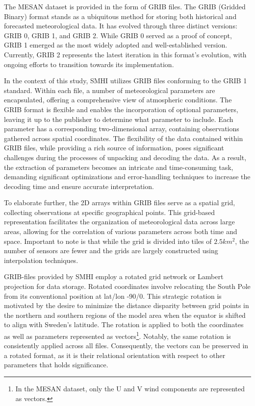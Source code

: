 The MESAN dataset is provided in the form of GRIB files. The GRIB (Gridded Binary) format stands as a ubiquitous method for storing both historical and forecasted meteorological data. It has evolved through three distinct versions: GRIB 0, GRIB 1, and GRIB 2. While GRIB 0 served as a proof of concept, GRIB 1 emerged as the most widely adopted and well-established version. Currently, GRIB 2 represents the latest iteration in this format's evolution, with ongoing efforts to transition towards its implementation.

In the context of this study, SMHI utilizes GRIB files conforming to the GRIB 1 standard. Within each file, a number of meteorological parameters are encapsulated, offering a comprehensive view of atmospheric conditions. The GRIB format is flexible and enables the incorporation of optional parameters, leaving it up to the publisher to determine what parameter to include. Each parameter has a corresponding two-dimensional array, containing observations gathered across spatial coordinates. The flexibility of the data contained within GRIB files, while providing a rich source of information, poses significant challenges during the processes of unpacking and decoding the data. As a result, the extraction of parameters becomes an intricate and time-consuming task, demanding significant optimizations and error-handling techniques to increase the decoding time and ensure accurate interpretation.

To elaborate further, the 2D arrays within GRIB files serve as a spatial grid, collecting observations at specific geographical points. This grid-based representation facilitates the organization of meteorological data across large areas, allowing for the correlation of various parameters across both time and space. Important to note is that while the grid is divided into tiles of $2.5 km^2$, the number of sensors are fewer and the grids are largely constructed using interpolation techniques.

GRIB-files provided by SMHI employ a rotated grid network or Lambert projection for data storage. Rotated coordinates involve relocating the South Pole from its conventional position at lat/lon -90/0. This strategic rotation is motivated by the desire to minimize the distance disparity between grid points in the northern and southern regions of the model area when the equator is shifted to align with Sweden's latitude. The rotation is applied to both the coordinates as well as parameters represented as vectors\footnote{In the MESAN dataset, only the U and V wind components are represented as vectors.}. Notably, the same rotation is consistently applied across all files. Consequently, the vectors can be preserved in a rotated format, as it is their relational orientation with respect to other parameters that holds significance.

